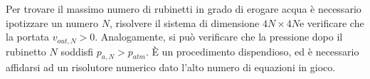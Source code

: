 \documentclass[oneside]{article}
\begin{document}
Per trovare il massimo numero di rubinetti in grado di erogare acqua è necessario
ipotizzare un numero $N$, risolvere il sistema di dimensione $4N\times4N$e verificare che
la portata $v_{out,N}>0$. Analogamente, si può verificare che la pressione dopo il
rubinetto $N$ soddisfi $p_{a,N}>p_{atm}$. È un procedimento dispendioso, ed è necessario
affidarsi ad un risolutore numerico dato l’alto numero di equazioni in gioco.
\end{document}
